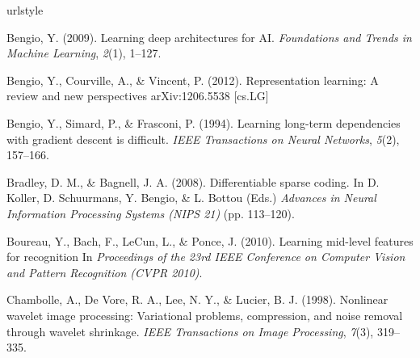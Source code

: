 \documentclass{article} %
\begin{document}
\begin{thebibliography}{100}
\providecommand{\natexlab}[1]{#1}
\expandafter\ifx\csname urlstyle\endcsname\relax
  \providecommand{\doi}[1]{doi:\discretionary{}{}{}#1}\else
  \providecommand{\doi}{doi:\discretionary{}{}{}\begingroup
  \urlstyle{rm}\Url}\fi



Bengio, Y. (2009). 
\newblock Learning deep architectures for AI. 
\newblock \emph{Foundations and Trends in Machine Learning}, \emph{2}(1), 1--127.

Bengio, Y., Courville, A., \& Vincent, P. (2012).
\newblock Representation learning: A review and new perspectives
\newblock arXiv:1206.5538 [cs.LG]

Bengio, Y., Simard, P., \& Frasconi, P. (1994). 
\newblock Learning long-term dependencies with gradient descent is difficult. 
\newblock \emph{IEEE Transactions on Neural Networks}, \emph{5}(2), 157--166.


Bradley, D. M., \& Bagnell, J. A. (2008).
\newblock Differentiable sparse coding.
\newblock In D. Koller, D. Schuurmans, Y. Bengio, \& L. Bottou (Eds.) \emph{Advances in Neural Information Processing Systems (NIPS 21)} (pp. 113--120).

Boureau, Y., Bach, F., LeCun, L., \& Ponce, J. (2010).
\newblock Learning mid-level features for recognition
\newblock In \emph{Proceedings of the 23rd IEEE Conference on Computer Vision and Pattern Recognition (CVPR 2010)}.

Chambolle, A., De Vore, R. A., Lee, N. Y., \& Lucier, B. J. (1998). 
\newblock Nonlinear wavelet image processing: Variational problems, compression, and noise removal through wavelet shrinkage. 
\newblock \emph{IEEE Transactions on Image Processing}, \emph{7}(3), 319--335.


\end{thebibliography}
\end{document}
